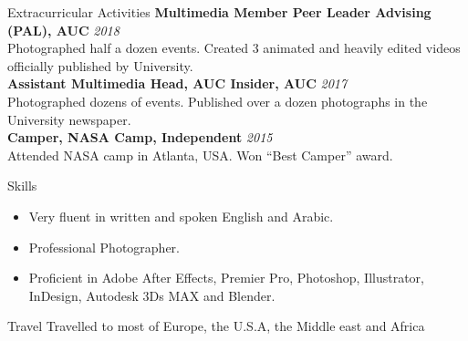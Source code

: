 \documentclass{resume}
\begin{document}
\begin{small}
\begin{rSection} {Extracurricular Activities}
		{\bf Multimedia Member Peer Leader Advising (PAL), AUC} \hfill {\em 2018}\\
		Photographed half a dozen events. Created 3 animated and heavily edited videos officially published by University.\\
		{\bf Assistant Multimedia Head, AUC Insider, AUC} \hfill {\em 2017}\\
		Photographed dozens of events. Published over a dozen photographs in the University newspaper.\\
		{\bf Camper, NASA Camp, Independent} \hfill {\em 2015}\\
		Attended NASA camp in Atlanta, USA. Won “Best Camper” award.\\
		
	\end{rSection}
	
	\begin{rSection}{Skills}
		\begin{itemize}
			\itemsep -0.4em
			\item Very fluent in written and spoken English and Arabic.
			\item Professional Photographer.
			\item Proficient in Adobe After Effects, Premier Pro, Photoshop, Illustrator, InDesign, Autodesk 3Ds MAX and Blender.
		\end{itemize}
	\end{rSection}
	\begin{rSection}{Travel}
		Travelled to most of Europe, the U.S.A, the Middle east and Africa
	\end{rSection}
\end{small}
	
\end{document}

